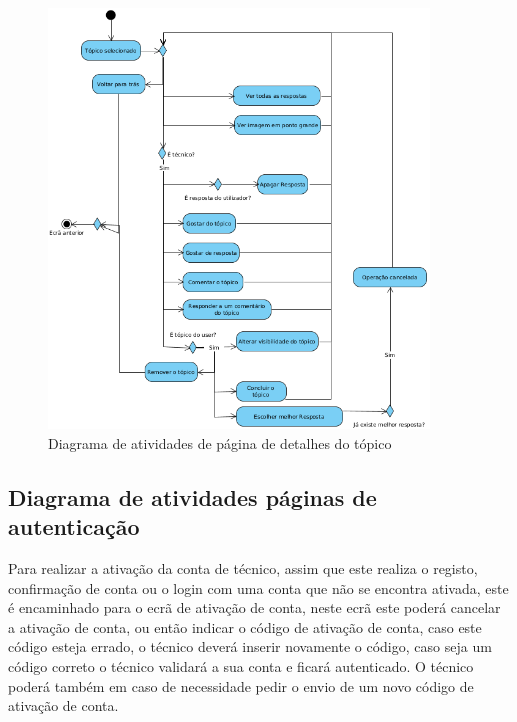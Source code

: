 \begin{figure}[htb]
    \centering
    \includegraphics[width=0.9\textwidth]{images/diagramas/atividades/diagrama_atividades_detalhes_topico.png}
    \caption{Diagrama de atividades de página de detalhes do tópico}
    \label{fig:25}
\end{figure}

\newpage

\subsection{Diagrama de atividades páginas de autenticação}

Para realizar a ativação da conta de técnico, assim que este realiza o registo, confirmação de conta ou 
o login com uma conta que não se encontra ativada, este é encaminhado para o ecrã de 
ativação de conta, neste ecrã este poderá cancelar a ativação de conta, ou então indicar o código 
de ativação de conta, caso este código esteja errado, o técnico deverá inserir novamente o código, 
caso seja um código correto o técnico validará a sua conta e ficará autenticado. O técnico poderá 
também em caso de necessidade pedir o envio de um novo código de ativação de conta.

